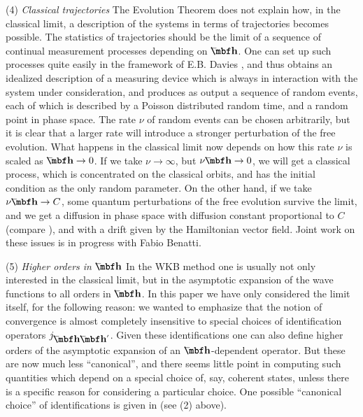 \item{(4)} {\it Classical trajectories}\hfill\break
The Evolution Theorem does not explain how, in the classical limit,
a description of the systems in terms of trajectories becomes
possible. The statistics of trajectories should be the limit of a
sequence of continual measurement processes depending on $\hb$.
One can set up such processes quite easily in the framework of E.B.
Davies \cite{Davies}, and thus obtains an idealized description of a
measuring device which is always in interaction with the system
under consideration, and produces as output a sequence of random
events, each of which is described by a Poisson distributed random
time, and a random point in phase space. The rate $\nu$ of random
events can be chosen arbitrarily, but it is clear that a larger rate
will introduce a stronger perturbation of the free evolution. What
happens in the classical limit now depends on how this rate $\nu$ is
scaled as $\hb\to0$. If we take $\nu\to\infty$, but $\nu\hb\to0$, we
will get a classical process, which is concentrated on the classical
orbits, and has the initial condition as the only random parameter.
On the other hand, if we take $\nu\hb\to C$, some quantum
perturbations of the free evolution survive the limit, and we get a
diffusion in phase space with diffusion constant proportional to
$C$ (compare \cite{Hajo}), and with a drift given by the Hamiltonian
vector field. Joint work on these issues is in progress with Fabio
Benatti.

\item{(5)} {\it Higher orders in $\hb$}\hfill\break
In the WKB method one is usually not only interested in the classical
limit, but in the asymptotic expansion of the wave functions to all
orders in $\hb$. In this paper we have only considered the limit
itself, for the following reason: we wanted to emphasize that the
notion of convergence is almost completely insensitive to special
choices of identification operators $\j\hb{\hb'}$.
Given these identifications one can also define higher orders of the
asymptotic expansion  of an $\hb$-dependent operator.  But these are
now much less ``canonical'', and there seems little point in
computing such quantities which depend on a special choice of, say,
coherent states, unless there is a specific reason for considering a
particular choice. One possible ``canonical choice'' of
identifications is given in \cite{CLJ} (see (2) above).


